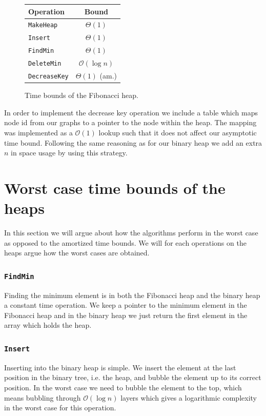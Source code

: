 \documentclass[a4paper,oneside,article,11pt]{memoir}
\begin{document}
\begin{figure}[H]
\centering
\begin{tabular}{l|c}
Operation & Bound \\\hline
\texttt{MakeHeap} & $\Theta(1)$ \\\hline
\texttt{Insert} & $\Theta(1)$ \\\hline
\texttt{FindMin} & $\Theta(1)$ \\\hline
\texttt{DeleteMin} & $\mathcal{O}(\log n)$ \\\hline
\texttt{DecreaseKey} & $\Theta(1)$ (am.)
\end{tabular}
\caption{Time bounds of the Fibonacci heap.}
\end{figure}

In order to implement the decrease key operation we include a table which maps node id from our graphs to a pointer to the node within the heap. The mapping was implemented as a $\mathcal{O}(1)$ lookup such that it does not affect our asymptotic time bound. Following the same reasoning as for our binary heap we add an extra $n$ in space usage by using this strategy.

\chapter{Worst case time bounds of the heaps}
\label{cpt:worst_case_bounds}
In this section we will argue about how the algorithms perform in the worst case as opposed to the amortized time bounds. We will for each operations on the heaps argue how the worst cases are obtained.

\subsection{\texttt{FindMin}}
Finding the minimum element is in both the Fibonacci heap and the binary heap a constant time operation. We keep a pointer to the minimum element in the Fibonacci heap and in the binary heap we just return the first element in the array which holds the heap.

\subsection{\texttt{Insert}}
Inserting into the binary heap is simple. We insert the element at the last position in the binary tree, i.e. the heap, and bubble the element up to its correct position. In the worst case we need to bubble the element to the top, which means bubbling through $\mathcal{O}(\log n)$ layers which gives a logarithmic complexity in the worst case for this operation.
\end{document}
